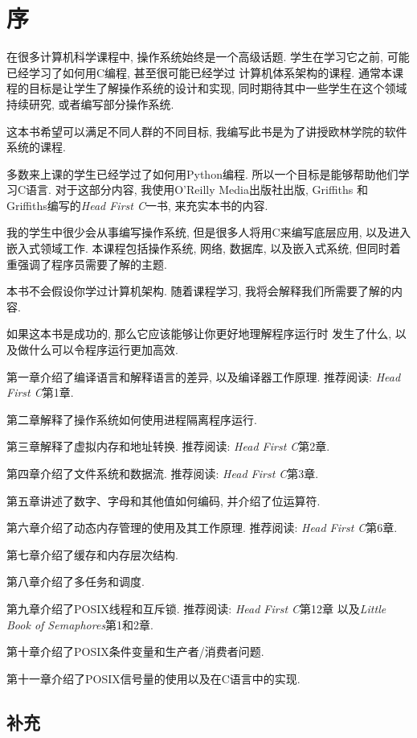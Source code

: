 \documentclass[12pt]{book}
\begin{document}
\chapter{序}
\label{preface}

在很多计算机科学课程中, 操作系统始终是一个高级话题.
学生在学习它之前, 可能已经学习了如何用C编程, 甚至很可能已经学过
计算机体系架构的课程. 通常本课程的目标是让学生了解操作系统的设计和实现,
同时期待其中一些学生在这个领域持续研究, 或者编写部分操作系统.

这本书希望可以满足不同人群的不同目标, 
我编写此书是为了讲授欧林学院的软件系统的课程.

多数来上课的学生已经学过了如何用Python编程.
所以一个目标是能够帮助他们学习C语言.
对于这部分内容, 我使用O'Reilly Media出版社出版, 
Griffiths 和 Griffiths编写的{\it Head First C}一书,
来充实本书的内容.

我的学生中很少会从事编写操作系统, 但是很多人将用C来编写底层应用, 
以及进入嵌入式领域工作. 本课程包括操作系统, 网络, 数据库, 以及嵌入式系统,
但同时着重强调了程序员需要了解的主题.

本书不会假设你学过计算机架构.
随着课程学习, 我将会解释我们所需要了解的内容.

如果这本书是成功的, 那么它应该能够让你更好地理解程序运行时
发生了什么, 以及做什么可以令程序运行更加高效.


第一章介绍了编译语言和解释语言的差异, 以及编译器工作原理.
推荐阅读: {\it Head First C}第1章.

第二章解释了操作系统如何使用进程隔离程序运行.

第三章解释了虚拟内存和地址转换.
推荐阅读: {\it Head First C}第2章.

第四章介绍了文件系统和数据流.
推荐阅读: {\it Head First C}第3章.

第五章讲述了数字、字母和其他值如何编码, 并介绍了位运算符.

第六章介绍了动态内存管理的使用及其工作原理.
推荐阅读: {\it Head First C}第6章.

第七章介绍了缓存和内存层次结构.

第八章介绍了多任务和调度.

第九章介绍了POSIX线程和互斥锁.
推荐阅读: {\it Head First C}第12章
以及{\it Little Book of Semaphores}第1和2章.

第十章介绍了POSIX条件变量和生产者/消费者问题.

第十一章介绍了POSIX信号量的使用以及在C语言中的实现.


\section*{补充}
\end{document}
